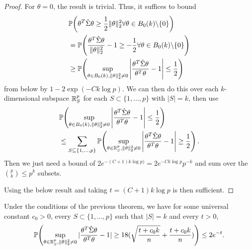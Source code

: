 \begin{proof}
  For $\theta = 0$, the result is trivial.  Thus, it suffices to bound
  \begin{align}
    \label{eq:71}
    &\Prob{\theta^{T} \hat \Sigma \theta \geq \frac{1}{2} \| \theta
      \|_{2}^{2} \forall \theta \in B_{0}(k) \backslash \{ 0 \}} \\
    &= \Prob{\frac{\theta^{T} \hat \Sigma \theta}{\| \theta
        \|_{2}^{2}} - 1 \geq -\frac{1}{2} \forall \theta \in B_{0}(k)
      \backslash \{ 0 \}  } \\
    &\geq \Prob{\sup_{\theta \in B_{0}(k), \| \theta \|_{2}^{2} \neq
        0} \left| \frac{\theta^{T} \hat \Sigma \theta}{\theta^{T}
          \theta} - 1 \right| \leq \frac{1}{2}}
  \end{align} from below by $1 - 2 \exp(-C k \log p)$.  We can then do
  this over each $k$-dimensional subspace $\mathbb{R}_{S}^{p}$ for each $S
  \subset \{ 1, \dots, p \} $ with $|S| = k$, then use
  \begin{align}
    \label{eq:72}
    &\Prob{\sup_{\theta \in B_{0}(k), \| \theta \|_{2}^{2} \neq
        0} \left| \frac{\theta^{T} \hat \Sigma \theta}{\theta^{T}
          \theta} - 1 \right| \leq \frac{1}{2}} \\
    &\leq \sum_{S
      \subseteq \{ 1, \dots, p \}}^{} \Prob{\sup_{\theta \in
        \R^{p}_{S}, \| \theta \|_{2}^{2} \neq 0} \left|
        \frac{\theta^{T} \hat \Sigma \theta}{\theta^{T} \theta} - 1
      \right| \geq \frac{1}{2} }.
  \end{align}
  Then we just need a bound of $2e^{-(C+1) k \log p)} = 2e^{-Ck \log
    p} p^{-k}$  and sum over the ${p \choose k}  \leq p^{k}$ subsets.

  Using the below result and taking $t = (C+1) k \log p$ is then sufficient.
\end{proof}

\begin{thm}
  Under the conditions of the previous theorem, we have for some
  universal constant $c_{0} > 0$, every $S \subset \{ 1, \dots, p \}$
  such that $|S| = k$ and every $t > 0$,
  \begin{equation}
    \label{eq:39}
    \Prob{\sup_{\theta \in \R^{p}_{S}, \| \theta \|_{2}^{2} \neq 0} |
      \frac{\theta^{T} \hat \Sigma \theta}{\theta^{T} \theta}  - 1 |
      \geq 18 (\sqrt{\frac{t + c_{0} k}{n}} + \frac{t + c_{0} k}{n} )
    } \leq 2 e^{-t}.
  \end{equation}
\end{thm}

